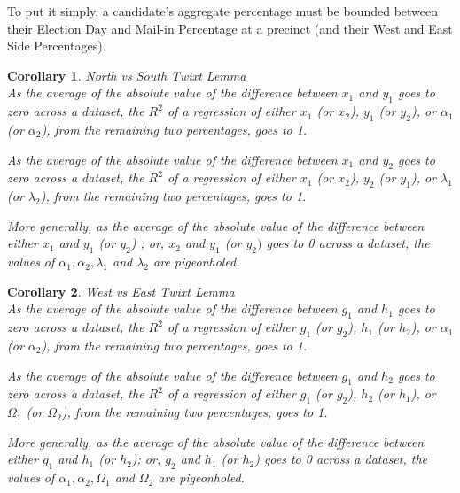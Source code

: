 \documentclass[preprint,13pt]{elsarticle}
\newtheorem{corollary}{Corollary}[theorem]
\begin{document}
To put it simply, a candidate's aggregate percentage must be bounded between their Election Day and Mail-in Percentage at a precinct (and their West and East Side Percentages).
\begin{corollary}{North vs South Twixt Lemma}\\
As the average of the absolute value of the difference between $x_{1}$ and $y_{1}$ goes to zero across a dataset, the $R^2$ of a regression of either $x_{1}$ (or $x_{2}$), $y_{1}$ (or $y_{2}$), or $\alpha_{1}$ (or $\alpha_{2}$), from the remaining two percentages, goes to 1.

As the average of the absolute value of the difference between $x_{1}$ and $y_{2}$ goes to zero across a dataset, the $R^2$ of a regression of either $x_{1}$ (or $x_{2}$), $y_{2}$ (or $y_{1}$), or $\lambda_{1}$ (or $\lambda_{2}$), from the remaining two percentages, goes to 1.

More generally, as the average of the absolute value of the difference between either $x_{1}$ and $y_{1}$ (or $y_{2}$) ; or, $x_{2}$ and $y_{1}$ (or $y_{2})$ goes to 0 across a dataset, the values of $\alpha_{1},\alpha_{2}, \lambda_{1}$ and $\lambda_{2}$ are pigeonholed.
\end{corollary}
\begin{corollary}{West vs East Twixt Lemma}\\
As the average of the absolute value of the difference between $g_{1}$ and $h_{1}$ goes to zero across a dataset, the $R^2$ of a regression of either $g_{1}$ (or $g_{2}$), $h_{1}$ (or $h_{2}$), or $\alpha_{1}$ (or $\alpha_{2}$), from the remaining two percentages, goes to 1.

As the average of the absolute value of the difference between $g_{1}$ and $h_{2}$ goes to zero across a dataset, the $R^2$ of a regression of either $g_{1}$ (or $g_{2}$), $h_{2}$ (or $h_{1}$), or $\Omega_{1}$ (or $\Omega_{2}$), from the remaining two percentages, goes to 1.

More generally, as the average of the absolute value of the difference between either $g_{1}$ and $h_{1}$ (or $h_{2}$); or, $g_{2}$ and $h_{1}$ (or $h_{2}$) goes to 0 across a dataset, the values of $\alpha_{1},\alpha_{2}, \Omega_{1}$ and $\Omega_{2}$ are pigeonholed.
\end{corollary}
\end{document}
